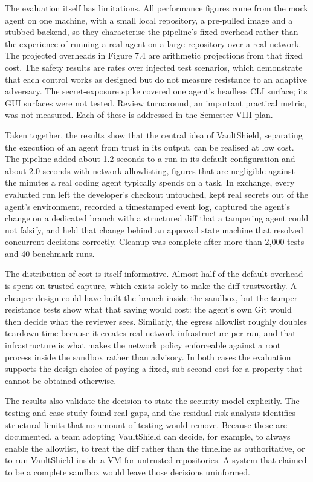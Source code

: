\documentclass[12pt,a4paper,oneside]{report}
\begin{document}
The evaluation itself has limitations. All performance figures come from the mock agent on one machine, with a small local repository, a pre-pulled image and a stubbed backend, so they characterise the pipeline's fixed overhead rather than the experience of running a real agent on a large repository over a real network. The projected overheads in Figure 7.4 are arithmetic projections from that fixed cost. The safety results are rates over injected test scenarios, which demonstrate that each control works as designed but do not measure resistance to an adaptive adversary. The secret-exposure spike covered one agent's headless CLI surface; its GUI surfaces were not tested. Review turnaround, an important practical metric, was not measured. Each of these is addressed in the Semester VIII plan.

Taken together, the results show that the central idea of VaultShield, separating the execution of an agent from trust in its output, can be realised at low cost. The pipeline added about 1.2 seconds to a run in its default configuration and about 2.0 seconds with network allowlisting, figures that are negligible against the minutes a real coding agent typically spends on a task. In exchange, every evaluated run left the developer's checkout untouched, kept real secrets out of the agent's environment, recorded a timestamped event log, captured the agent's change on a dedicated branch with a structured diff that a tampering agent could not falsify, and held that change behind an approval state machine that resolved concurrent decisions correctly. Cleanup was complete after more than 2,000 tests and 40 benchmark runs.

The distribution of cost is itself informative. Almost half of the default overhead is spent on trusted capture, which exists solely to make the diff trustworthy. A cheaper design could have built the branch inside the sandbox, but the tamper-resistance tests show what that saving would cost: the agent's own Git would then decide what the reviewer sees. Similarly, the egress allowlist roughly doubles teardown time because it creates real network infrastructure per run, and that infrastructure is what makes the network policy enforceable against a root process inside the sandbox rather than advisory. In both cases the evaluation supports the design choice of paying a fixed, sub-second cost for a property that cannot be obtained otherwise.

The results also validate the decision to state the security model explicitly. The testing and case study found real gaps, and the residual-risk analysis identifies structural limits that no amount of testing would remove. Because these are documented, a team adopting VaultShield can decide, for example, to always enable the allowlist, to treat the diff rather than the timeline as authoritative, or to run VaultShield inside a VM for untrusted repositories. A system that claimed to be a complete sandbox would leave those decisions uninformed.
\end{document}
